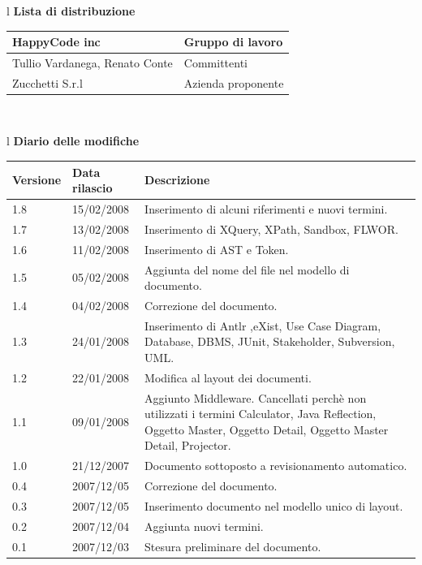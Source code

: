 \documentclass[11pt,titlepage,a4paper]{report}
\begin{document}
\begin{center}
\begin{table}[hbtp]
\large{
\begin{tabular}{l}
\Large{\textbf{\textsf{Lista di distribuzione}}} \\
\begin{tabular}{||p{6cm}||p{6cm}||} \hline
{HappyCode inc}& Gruppo di lavoro \\ \hline
{Tullio Vardanega, Renato Conte}& Committenti \\ \hline 
{Zucchetti S.r.l}& Azienda proponente\\ \hline
\end{tabular} \\
\end{tabular}
}
\end{table}
\begin{table}[hbtp]
\large{
\begin{tabular}{l}
\Large{\textbf{\textsf{Diario delle modifiche}}} \\
\begin{tabular}{||p{2cm}||p{3.5cm}||p{6cm}||} \hline
\textbf{Versione} & \textbf{Data rilascio} & \textbf{Descrizione} \\ \hline
1.8 & 15/02/2008 & Inserimento di alcuni riferimenti e nuovi termini.\\ \hline
1.7 & 13/02/2008 & Inserimento di XQuery, XPath, Sandbox, FLWOR.\\ \hline
1.6 & 11/02/2008 & Inserimento di AST e Token.\\ \hline
1.5 & 05/02/2008 & Aggiunta del nome del file nel modello di documento.\\ \hline
1.4 & 04/02/2008 & Correzione del documento.\\ \hline
1.3 & 24/01/2008 & Inserimento di Antlr ,eXist, Use Case Diagram, Database, DBMS, JUnit, Stakeholder, Subversion, UML.\\ \hline
1.2 & 22/01/2008 & Modifica al layout dei documenti.\\ \hline
1.1 & 09/01/2008 & Aggiunto Middleware. Cancellati perch\`e non utilizzati i termini Calculator, Java Reflection, Oggetto Master, Oggetto Detail, Oggetto Master Detail, Projector.\\ \hline
1.0 & 21/12/2007 & Documento sottoposto a revisionamento automatico.\\ \hline
0.4 & 2007/12/05 & Correzione del documento. \\ \hline
0.3 & 2007/12/05 & Inserimento documento nel modello unico di layout. \\ \hline
0.2 & 2007/12/04 & Aggiunta nuovi termini. \\ \hline
0.1 & 2007/12/03 & Stesura preliminare del documento. \\ \hline

\end{tabular} \\
\end{tabular}

}
\end{table}
\end{center}
\newpage
\tableofcontents
\end{document}
